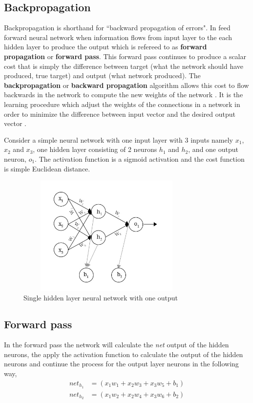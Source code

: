 \subsection{Backpropagation}\label{backprop}
Backpropagation is shorthand for ``backward propagation of errors". In feed forward neural network when information flows from input layer to the each hidden layer to produce the output which is refereed to as \textbf{forward propagation} or \textbf{forward pass}. This forward pass continues to produce a scalar cost that is simply the difference between target (what the network should have produced, true target) and output (what network produced). The \textbf{backpropagation} or \textbf{backward propagation} algorithm allows this cost to flow backwards in the network to compute the new weights of the network \cite{goodfellow2016deep}. It is the learning procedure which adjust the weights of the connections in a network in order to minimize the difference between input vector and the desired output vector \cite{rumelhart1988learning}.

Consider a simple neural network with one input layer with 3 inputs namely $x_{1}$, $x_{2}$ and $x_{3}$, one hidden layer consisting of 2 neurons $h_{1}$ and $h_{2}$, and one output neuron, $o_{1}$. The activation function is a sigmoid activation and the cost function is simple Euclidean distance. 

\begin{figure}[!ht]
    \centering
    \includegraphics[width=9cm, height=6cm, keepaspectratio]{pics/backprop1.jpg}
    \caption{Single hidden layer neural network with one output}
    \label{fig:backPropExample}
\end{figure}

\subsection*{Forward pass}
In the forward pass the network will calculate the \textit{net} output of the hidden neurons, the apply the activation function to calculate the output of the hidden neurons and continue the process for the output layer neurons in the following way,
\begin{align}
    net_{h_{1}} &= (x_{1}w_{1}+x_{2}w_{3}+x_{3}w_{5}+b_{1})\\
    net_{h_{2}} &= (x_{1}w_{2}+x_{2}w_{4}+x_{3}w_{6}+b_{2})
\end{align}

